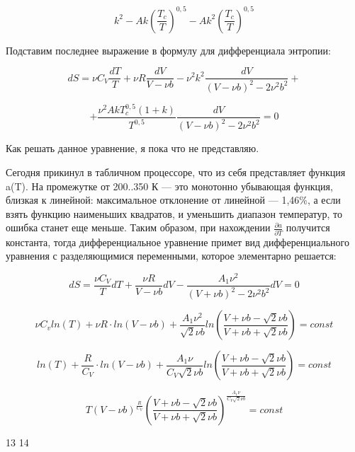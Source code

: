 \documentclass[a4paper,14pt]{article}
\theoremstyle{plain} %
\theoremstyle{definition} %
\theoremstyle{remark} %
\begin{document}
$$ k^2 - A k \left( \frac{T_c}{T} \right)^{0,5} - A k^2 \left( \frac{T_c}{T} \right)^{0,5} $$

Подставим последнее выражение в формулу для дифференциала энтропии:

$$ d S = \nu C_V \frac{d T}{T} + \nu R \frac{d V}{V - \nu b} - \nu^2 k^2 \frac{d V}{(V - \nu b)^2 - 2 \nu^2 b^2} +  $$

$$ + \frac{\nu^2 A k T_c^{0,5}(1 + k)}{T^{0,5}} \frac{d V}{(V - \nu b)^2 - 2 \nu^2 b^2} = 0 $$

Как решать данное уравнение, я пока что не представляю. 

Сегодня прикинул в табличном процессоре, что из себя представляет функция a(T). На промежутке от 200..350 К --- это монотонно убывающая функция, близкая к линейной: максимальное отклонение от линейной --- 1,46\%, а если взять функцию наименьших квадратов, и уменьшить диапазон температур, то ошибка станет еще меньше. Таким образом, при нахождении $ \frac{\partial a}{\partial T} $ получится константа, тогда дифференциальное уравнение примет вид дифференциального уравнения с разделяющимися переменными, которое элементарно решается:

$$ d S = \frac{\nu C_V}{T} d T + \frac{\nu R}{V - \nu b} d V - \frac{A_1 \nu^2}{(V + \nu b)^2 - 2 \nu^2 b^2} d V = 0 $$

$$ \nu C_v ln (T) + \nu R \cdot ln (V - \nu b) + \frac{A_1 \nu^2 }{ \sqrt{2} \nu b } ln \left( \frac{ V + \nu b - \sqrt{2} \nu b }{ V + \nu b + \sqrt{2} \nu b } \right) = const $$

$$ ln (T) + \frac{R}{C_V} \cdot ln (V - \nu b) + \frac{A_1 \nu }{ C_V \sqrt{2} \nu b } ln \left( \frac{ V + \nu b - \sqrt{2} \nu b }{ V + \nu b + \sqrt{2} \nu b } \right) = const $$ 

$$ T (V - \nu b)^{\frac{R}{C_V}} \left(  \frac{ V + \nu b - \sqrt{2} \nu b }{ V + \nu b + \sqrt{2} \nu b } \right) ^ { \frac{A_1 \nu }{ C_V \sqrt{2} \nu b } } = const $$

\newpage

13
14
\end{document}
